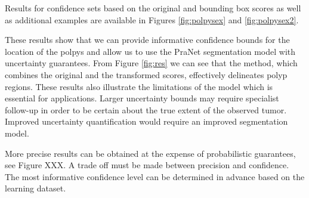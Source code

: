 Results for confidence sets based on the original and bounding box scores as well as additional examples are available in Figures \ref{fig:polpysex} and \ref{fig:polpysex2}.

These results show that we can provide informative confidence bounds for the location of the polpys and allow us to use the PraNet segmentation model with uncertainty guarantees. From Figure \ref{fig:res} we can see that the method, which combines the original and the transformed scores, effectively delineates polyp regions. These results also illustrate the limitations of the model which is essential for applications. Larger uncertainty bounds may require specialist follow-up in order to be certain about the true extent of the observed tumor. Improved uncertainty quantification would require an improved segmentation model. 

More precise results can be obtained at the expense of probabilistic guarantees, see Figure XXX. A trade off must be made between precision and confidence. The most informative confidence level can be determined in advance based on the learning dataset. 


